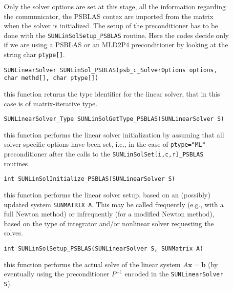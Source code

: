 \documentclass[twoside,a4paper]{refart}
\theoremstyle{definition}
\begin{document}
\begin{description}

\item[] Only the solver options are set at this stage, all the information regarding the communicator, the PSBLAS contex are imported from the matrix when the solver is initialized. The setup of the preconditioner has to be done with the \lstinline[style=CStyle]|SUNLinSolSetup_PSBLAS| routine. Here the codes decide only if we are using a PSBLAS or an MLD2P4 preconditioner by looking at the string char \lstinline[style=CStyle]|ptype[]|.
	
 \lstinline[style=CStyle]|SUNLinearSolver SUNLinSol_PSBLAS(psb_c_SolverOptions options, char methd[], char ptype[])|

\item[] this function returns the type identifier for the linear solver, that in this case is of matrix-iterative type.

 \lstinline[style=CStyle]|SUNLinearSolver_Type SUNLinSolGetType_PSBLAS(SUNLinearSolver S)|

\item[] this function performs the linear solver initialization by assuming that all solver-specific options have been set, i.e., in the case of \lstinline[style=CStyle]|ptype="ML"| preconditioner after the calls to the \texttt{SUNLinSolSet[i,c,r]\_PSBLAS} routines.

 \lstinline[style=CStyle]|int SUNLinSolInitialize_PSBLAS(SUNLinearSolver S)|

\item[] this function performs the linear solver setup, based on an (possibly) updated system \lstinline[style=CStyle]|SUNMATRIX A|. This may be called frequently (e.g., with a full
Newton method) or infrequently (for a modified Newton method), based on the type of
integrator and/or nonlinear solver requesting the solves.

 \lstinline[style=CStyle]|int SUNLinSolSetup_PSBLAS(SUNLinearSolver S, SUNMatrix A)|

\item[] this function performs the actual solve of the linear system $A\mathbf{x} = \mathbf{b}$ (by eventually using the preconditioner $P^{-1}$ encoded in the \lstinline[style=CStyle]|SUNLinearSolver S|).


\end{description}
\end{document}
